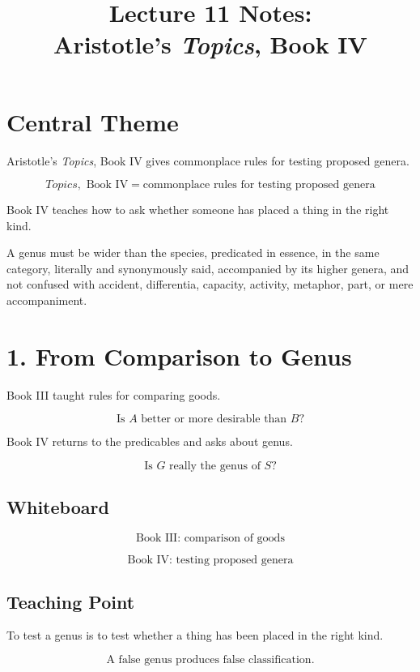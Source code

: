 \documentclass[12pt]{article}
\title{Lecture 11 Notes:\\ Aristotle's \textit{Topics}, Book IV}
\author{}
\date{}
\begin{document}
\maketitle

\section*{Central Theme}

Aristotle's \textit{Topics}, Book IV gives commonplace rules for testing
proposed genera.

\[
\boxed{
\textit{Topics}, \text{ Book IV}
=
\text{commonplace rules for testing proposed genera}
}
\]

Book IV teaches how to ask whether someone has placed a thing in the right
kind.

A genus must be wider than the species, predicated in essence, in the same
category, literally and synonymously said, accompanied by its higher genera, and
not confused with accident, differentia, capacity, activity, metaphor, part, or
mere accompaniment.

\section*{1. From Comparison to Genus}

Book III taught rules for comparing goods.

\[
\text{Is } A \text{ better or more desirable than } B?
\]

Book IV returns to the predicables and asks about genus.

\[
\text{Is } G \text{ really the genus of } S?
\]

\subsection*{Whiteboard}

\[
\text{Book III: comparison of goods}
\]

\[
\text{Book IV: testing proposed genera}
\]

\subsection*{Teaching Point}

To test a genus is to test whether a thing has been placed in the right kind.

\[
\boxed{
\text{A false genus produces false classification.}
}
\]
\end{document}
